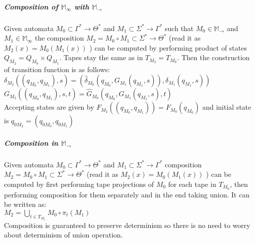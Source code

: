 \documentclass[12pt]{article}
\begin{document}
\subparagraph{Composition of $\mathbb{M}_\infty$ with $\mathbb{M}_\rightarrow$} Given automata $M_0 \subset \Gamma^* \rightarrow \Theta^* $ and $M_1 \subset \Sigma^* \rightarrow \Gamma^*$ such that  $M_0 \in \mathbb{M}_\rightarrow$ and $M_1 \in \mathbb{M}_\infty$ the composition $M_2=M_0 \circ M_1 \subset \Sigma^* \rightarrow \Theta^*$ (read it as $M_2(x) = M_0(M_1(x))$ ) can be computed by performing product of states $Q_{M_2} = Q_{M_0} \times Q_{M_1}$. Tapes stay the same as in $T_{M_2} = T_{M_0}$. Then the construction of transition function is as follows:\\
$\delta_{M_2}((q_{M_0},q_{M_1}),s) = 
( \hat{\delta}_{M_0}(q_{M_0},G_{M_1}(q_{M_1},s) ) , \delta_{M_1}(q_{M_1},s) )
$\\
$G_{M_2}((q_{M_0},q_{M_1}),s,t) = \hat{G}_{M_0}(q_{M_0}, G_{M_1}(q_{M_1},s),t )
$\\
Accepting states are given by $F_{M_2}((q_{M_0},q_{M_1})) = F_{M_0}(q_{M_0})$ and initial state is $q_{0M_2} = (q_{0M_0},q_{0M_1})$


\subparagraph{Composition in $\mathbb{M}_\rightarrow$} Given automata $M_0 \subset \Gamma^* \rightarrow \Theta^* $ and $M_1 \subset \Sigma^* \rightarrow \Gamma^*$ composition $M_2=M_0 \circ M_1 \subset \Sigma^* \rightarrow \Theta^*$ (read it as $M_2(x) = M_0(M_1(x))$ ) can be computed by first performing tape projections of $M_0$ for each tape in $T_{M_0}$, then performing composition for them separately and in the end taking union. It can be written as: \\
$M_2 = \bigcup_{t\in T_{M_1}} M_0 \circ \pi_t(M_1)$ \\
Composition is guaranteed to preserve determinism so there is no need to worry about determinism of union operation.
\end{document}
